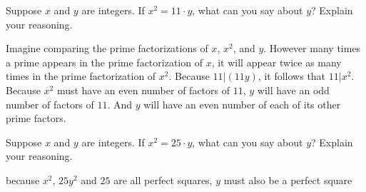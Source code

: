 \documentclass[nooutcomes]{ximera}
\begin{document}
\begin{problem}
Suppose $x$ and $y$ are integers.  If $x^2 = 11\cdot y$, what can you say about $y$? Explain your
  reasoning.
\begin{freeResponse}
\begin{hint}
Imagine comparing the prime factorizations of $x$, $x^2$, and $y$.  However many times a prime appears in the prime factorization of $x$, it will appear twice as many times in the prime factorization of $x^2$.  Because $11|(11y)$, it follows that $11|x^2$.  Because $x^2$ must have an even number of factors of $11$, $y$ will have an odd number of factors of $11$.  And $y$ will have an even number of each of its other prime factors.  
\end{hint}
\end{freeResponse}
\end{problem}

\begin{problem}
Suppose $x$ and $y$ are integers.  If $x^2 = 25\cdot y$, what can you say about $y$? Explain your
  reasoning.
\begin{freeResponse}
\begin{hint}
because $x^2$, $25y^2$ and $25$ are all perfect squares, $y$ must also be a perfect square 
\end{hint}
\end{freeResponse}
\end{problem}

\end{document}
